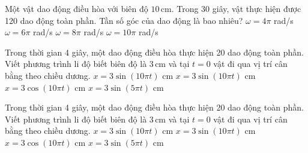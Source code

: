 \begin{ex}
Một vật dao động điều hòa với biên độ $10\,\text{cm}$. Trong 30 giây, vật thực hiện được 120 dao động toàn phần. Tần số góc của dao động là bao nhiêu?
\choice
{$\omega = 4\pi$ rad/s}
{$\omega = 6\pi$ rad/s}
{\True $\omega = 8\pi$ rad/s}
{$\omega = 10\pi$ rad/s}
\end{ex}

\begin{ex}
Trong thời gian 4 giây, một dao động điều hòa thực hiện 20 dao động toàn phần. Viết phương trình li độ biết biên độ là $3\,\text{cm}$ và tại $t = 0$ vật đi qua vị trí cân bằng theo chiều dương.
\choice
{$x = 3\sin(10\pi t)$ cm}
{\True $x = 3\sin(10\pi t)$ cm}
{$x = 3\cos(10\pi t)$ cm}
{$x = 3\sin(5\pi t)$ cm}
\end{ex}

\begin{ex}
Trong thời gian 4 giây, một dao động điều hòa thực hiện 20 dao động toàn phần. Viết phương trình li độ biết biên độ là $3\,\text{cm}$ và tại $t = 0$ vật đi qua vị trí cân bằng theo chiều dương.
\choice
{$x = 3\sin(10\pi t)$ cm}
{\True $x = 3\sin(10\pi t)$ cm}
{$x = 3\cos(10\pi t)$ cm}
{$x = 3\sin(5\pi t)$ cm}
\end{ex}

